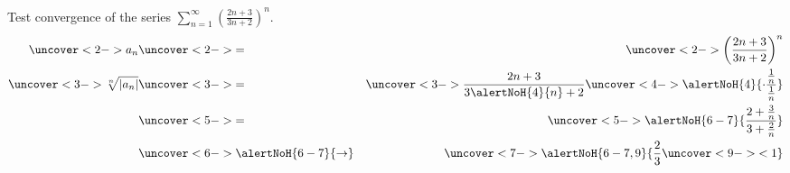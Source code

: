 \begin{frame}
\begin{example}
Test convergence of the series $\displaystyle \sum_{n=1}^\infty \left( \frac{2n + 3}{3n+2}\right)^n$.
\abovedisplayskip=0pt
\belowdisplayskip=0pt
\begin{eqnarray*}
\uncover<2->{%
a_n %
}%
 & \uncover<2->{=} & %
\uncover<2->{%
\left( \frac{2n+3}{3n+2}\right)^n%
}\\%
\uncover<3->{%
\sqrt[n]{\left| a_n\right|} %
}%
 & \uncover<3->{=} & %
\uncover<3->{%
\frac{2n+3}{3\alertNoH{ 4}{n}+2}\uncover<4->{\alertNoH{ 4}{\cdot \frac{\frac{1}{n}}{\frac{1}{n}}}}%
}\\%
 & \uncover<5->{=} & %
\uncover<5->{%
\alertNoH{ 6-7}{%
\frac{2 + \frac{3}{n}}{3+\frac{2}{n}}%
}%
}\\%
 & \uncover<6->{\alertNoH{ 6-7}{\to}} & %
\uncover<7->{%
\alertNoH{ 6-7,9}{%
\frac{2}{3} \uncover<9->{ < 1 }
}%
}%
\end{eqnarray*}
%
\end{example}
\end{frame}
